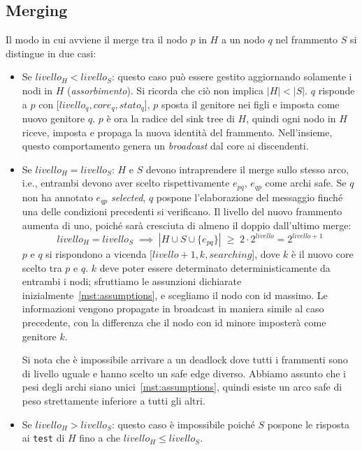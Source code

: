 \documentclass[target=bach,aauheader=,style=]{thud}
\newcommand{\eng}[1]{\foreignlanguage{english}{#1}}
\begin{document}
\subsection{\eng{Merging}}\label{ghs:merging}
Il modo in cui avviene il \eng{merge} tra il nodo $p$ in $H$ a un nodo $q$ nel frammento $S$ si distingue in due casi:
\begin{itemize}
  \item Se $livello_H<livello_S$: questo caso può essere gestito aggiornando solamente i nodi in $H$ (\emph{assorbimento}). Si ricorda che ciò non implica $|H|<|S|$. $q$ risponde a $p$ con [$livello_q, core_q, stato_q$], $p$ sposta il genitore nei figli e imposta come nuovo genitore $q$. $p$ è ora la radice del \eng{sink tree} di $H$, quindi ogni nodo in $H$ riceve, imposta e propaga la nuova identità del frammento. Nell’insieme, questo comportamento genera un \emph{\eng{broadcast}} dal core ai discendenti. 
  \item Se $livello_H=livello_S$: $H$ e $S$ devono intraprendere il \eng{merge} sullo stesso arco, i.e., entrambi devono aver scelto rispettivamente $e_{pq}$, $e_{qp}$ come archi \eng{safe}. Se $q$ non ha annotato $e_{qp}$ \emph{\eng{selected}}, $q$ pospone l'elaborazione del messaggio finché una delle condizioni precedenti si verificano. Il livello del nuovo frammento aumenta di uno, poiché sarà cresciuta di almeno il doppio dall'ultimo \eng{merge}:
  $$
  livello_H=livello_S\;\implies\;|H\cup S\cup\{e_{pq}\}|\;\ge\;2\cdot 2^{livello}=2^{livello+1}
  $$
  $p$ e $q$ si rispondono a vicenda [$livello+1, k, searching$], dove $k$ è il nuovo core scelto tra $p$ e $q$. $k$ deve poter essere determinato deterministicamente da entrambi i nodi; sfruttiamo le assunzioni dichiarate inizialmente~\ref{mst:assumptions}, e scegliamo il nodo con id massimo. Le informazioni vengono propagate in \eng{broadcast} in maniera simile al caso precedente, con la differenza che il nodo con id minore imposterà come genitore $k$.
  
  Si nota che è impossibile arrivare a un \eng{deadlock} dove tutti i frammenti sono di livello uguale e hanno scelto un \eng{safe edge} diverso. Abbiamo assunto che i pesi degli archi siano unici~\ref{mst:assumptions}, quindi esiste un arco \eng{safe} di peso strettamente inferiore a tutti gli altri.
  \item Se $livello_H>livello_S$: questo caso è impossibile poiché $S$ pospone le risposta ai \lstinline{test} di $H$ fino a che $livello_H\leq livello_S$.
\end{itemize}
\end{document}
